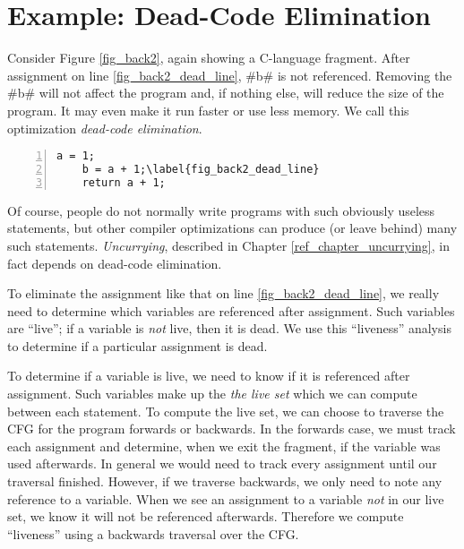 \documentclass[12pt]{report}
\begin{document}
\section{Example: Dead-Code Elimination}

Consider Figure \ref{fig_back2}, again showing a C-language fragment.
After assignment on line \ref{fig_back2_dead_line}, #b# is not
referenced. Removing the #b# will not affect the program and,
if nothing else, will reduce the size of the program. It may even make
it run faster or use less memory. We call this optimization
\emph{dead-code elimination}.

\begin{myfig}[ht]
\begin{minipage}{1in}
  \begin{Verbatim}[numbers=left,commandchars=\\\{\}]
    a = 1;
    b = a + 1;\label{fig_back2_dead_line}
    return a + 1;
  \end{Verbatim}
\end{minipage}
\caption{A C-language fragment illustrating \emph{dead code}. After
assignment on line \ref{fig_back2_dead_line}, \verb=b= is not used
and can be considered ``dead.''}
\label{fig_back2}
\end{myfig}

Of course, people do not normally write programs with such obviously
useless statements, but other compiler optimizations can produce (or
leave behind) many such statements. \emph{Uncurrying}, described in
Chapter \ref{ref_chapter_uncurrying}, in fact depends on dead-code elimination.

To eliminate the assignment like that on line
\ref{fig_back2_dead_line}, we really need to determine which variables
are referenced after assignment. Such variables are ``live''; if a
variable is \emph{not} live, then it is dead. We use this ``liveness''
analysis to determine if a particular assignment is dead.

To determine if a variable is live, we need to know if it is
referenced after assignment.  Such variables make up the \emph{the
  live set} which we can compute between each statement. To compute
the live set, we can choose to traverse the CFG for the program forwards or
backwards.  In the forwards case, we must track each assignment and
determine, when we exit the fragment, if the variable was used
afterwards. In general we would need to track every assignment until
our traversal finished. However, if we traverse backwards, we only
need to note any reference to a variable. When we see an assignment to
a variable \emph{not} in our live set, we know it will not be
referenced afterwards. Therefore we compute ``liveness'' using a
backwards traversal over the CFG.
\end{document}
